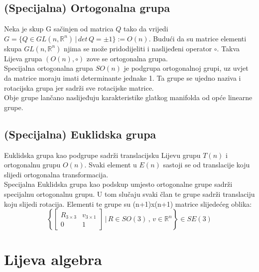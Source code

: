 \documentclass[times, utf8, diplomski, numeric]{fer}
\begin{document}
	\subsection{(Specijalna) Ortogonalna grupa} Neka je skup G sačinjen od matrica $Q$ tako da vrijedi \\ 
	$G = \{ Q \in GL(n, \mathbb{R}^n) \,|\, det \, Q = \pm 1\} := O(n)$. Budući da su matrice elementi skupa $GL(n, \mathbb{R}^n)$ njima se može pridodijeliti i naslijeđeni operator $\circ$. Takva Lijeva grupa $(O(n),\circ)$ zove se ortogonalna grupa. \\
	Specijalna ortogonalna grupa $SO(n)$ je podgrupa ortogonalnoj grupi, uz uvjet da matrice moraju imati determinante jednake 1. Ta grupe se ujedno naziva i rotacijska grupa jer sadrži sve rotacijske matrice. \\
	Obje grupe lančano naslijeđuju karakteristike glatkog manifolda od opće linearne grupe.
	
	\subsection{(Specijalna) Euklidska grupa} Euklidska grupa kao podgrupe sadrži translacijsku Lijevu grupu $T(n)$ i ortogonalnu grupu $O(n)$. Svaki element u $E(n)$ sastoji se od translacije koju slijedi ortogonalna transformacija. \\
	Specijalna Euklidska grupa kao podskup umjesto ortogonalne grupe sadrži specijalnu ortogonalnu grupu. U tom slučaju svaki član te grupe sadrži translaciju koju slijedi rotacija. Elementi te grupe su (n+1)x(n+1) matrice slijedećeg oblika: \\
	
	\begin{equation}
		\left \{
		\begin{bmatrix}
		R_{3 \times 3} & v_{3 \times 1} \\
		0 & 1
		\end{bmatrix}
		\, \Biggr\rvert \, R \in SO(3) \, , \, v \in \mathbb{R}^n
		\right \} \in SE(3)
	\end{equation}	

\section{Lijeva algebra}
\end{document}
